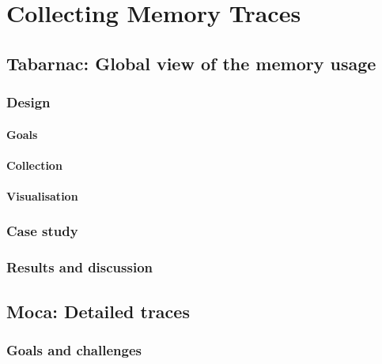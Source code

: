 \chapter{Collecting Memory Traces}

\section{Tabarnac: Global view of the memory usage}


\subsection{Design}

\subsubsection{Goals}

\subsubsection{Collection}

\subsubsection{Visualisation}

\subsection{Case study}

\subsection{Results and discussion}


\section{Moca: Detailed traces}

\subsection{Goals and challenges}


